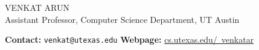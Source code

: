 \documentclass[notitlepage]{article}
\newcommand{\heading}[1]{\vspace{1em}{\large \MakeUppercase{\textrm{#1}}}

  \hrulefill
}
\begin{document}
\begin{center}
  {\huge VENKAT ARUN}\\
  \vspace{1em}
  {\large Assistant Professor, Computer Science Department, UT Austin}
\end{center}

{\bf Contact: } {\tt venkat@utexas.edu} \hfill {\bf Webpage:} \href{https://www.cs.utexas.edu/~venkatar/}{cs.utexas.edu/~venkatar}\\




\end{document}
